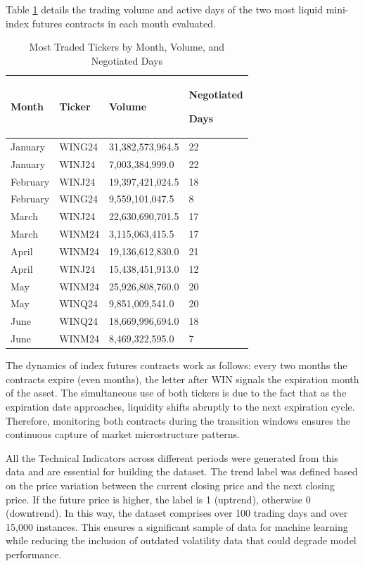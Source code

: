 \documentclass{ieeeaccess}
\begin{document}
Table \ref{tab:traded_tickers} details the trading volume and active days of the two most liquid mini-index futures contracts in each month evaluated.

\begin{table}
\caption{Most Traded Tickers by Month, Volume, and Negotiated Days}
\label{tab:traded_tickers}
\setlength{\tabcolsep}{3pt}
\begin{tabular}{|p{45pt}|p{45pt}|p{75pt}|p{50pt}|}
\hline
Month& 
Ticker& 
Volume& 
Negotiated \par Days \\
\hline
January & WING24 & 31,382,573,964.5 & 22 \\
January & WINJ24 & 7,003,384,999.0 & 22 \\
February & WINJ24 & 19,397,421,024.5 & 18 \\
February & WING24 & 9,559,101,047.5 & 8 \\
March & WINJ24 & 22,630,690,701.5 & 17 \\
March & WINM24 & 3,115,063,415.5 & 17 \\
April & WINM24 & 19,136,612,830.0 & 21 \\
April & WINJ24 & 15,438,451,913.0 & 12 \\
May & WINM24 & 25,926,808,760.0 & 20 \\
May & WINQ24 & 9,851,009,541.0 & 20 \\
June & WINQ24 & 18,669,996,694.0 & 18 \\
June & WINM24 & 8,469,322,595.0 & 7 \\
\hline
\end{tabular}
\end{table}

The dynamics of index futures contracts work as follows: every two months the contracts expire (even months), the letter after WIN signals the expiration month of the asset. The simultaneous use of both tickers is due to the fact that as the expiration date approaches, liquidity shifts abruptly to the next expiration cycle. Therefore, monitoring both contracts during the transition windows ensures the continuous capture of market microstructure patterns.

All the Technical Indicators across different periods were generated from this data and are essential for building the dataset. The trend label was defined based on the price variation between the current closing price and the next closing price. If the future price is higher, the label is 1 (uptrend), otherwise 0 (downtrend). In this way, the dataset comprises over 100 trading days and over 15,000 instances. This ensures a significant sample of data for machine learning while reducing the inclusion of outdated volatility data that could degrade model performance.
\end{document}
